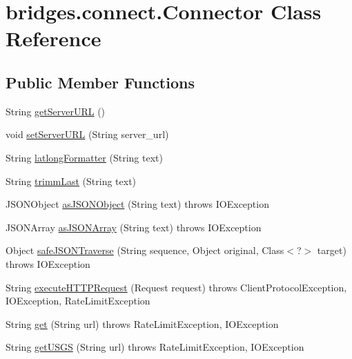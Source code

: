\hypertarget{classbridges_1_1connect_1_1_connector}{}\section{bridges.\+connect.\+Connector Class Reference}
\label{classbridges_1_1connect_1_1_connector}
\subsection*{Public Member Functions}
\begin{DoxyCompactItemize}
\item 
String \hyperlink{classbridges_1_1connect_1_1_connector_a0b9809180aac96a83e31e224ab5ed6ec}{get\+Server\+U\+R\+L} ()
\item 
void \hyperlink{classbridges_1_1connect_1_1_connector_a71f449c91e529f79730df27e01fdf674}{set\+Server\+U\+R\+L} (String server\+\_\+url)
\item 
String \hyperlink{classbridges_1_1connect_1_1_connector_a2318cd93d18ef58285598f6f9cdf727b}{latlong\+Formatter} (String text)
\item 
String \hyperlink{classbridges_1_1connect_1_1_connector_ac0dca0bd99b6abbbd8a77874a95e6d49}{trimm\+Last} (String text)
\item 
J\+S\+O\+N\+Object \hyperlink{classbridges_1_1connect_1_1_connector_aac3fb75dd7975c4439cfd1bf6cefe0a6}{as\+J\+S\+O\+N\+Object} (String text)  throws I\+O\+Exception 
\item 
J\+S\+O\+N\+Array \hyperlink{classbridges_1_1connect_1_1_connector_aa5bd647713545fa24c6d730eacb6bc54}{as\+J\+S\+O\+N\+Array} (String text)  throws I\+O\+Exception 
\item 
Object \hyperlink{classbridges_1_1connect_1_1_connector_ab7d1d242fbf9acade316650e54a3d020}{safe\+J\+S\+O\+N\+Traverse} (String sequence, Object original, Class$<$?$>$ target)  throws I\+O\+Exception 
\item 
String \hyperlink{classbridges_1_1connect_1_1_connector_aabcfde23d155c8c42edb8a1407320bc5}{execute\+H\+T\+T\+P\+Request} (Request request)  throws Client\+Protocol\+Exception, I\+O\+Exception, Rate\+Limit\+Exception 
\item 
String \hyperlink{classbridges_1_1connect_1_1_connector_aec8d54bf707c50d6f8173a0c1640fcd5}{get} (String url)  throws Rate\+Limit\+Exception, I\+O\+Exception 
\item 
String \hyperlink{classbridges_1_1connect_1_1_connector_a1781405c9b38c338bce042bf7ff23eaf}{get\+U\+S\+G\+S} (String url)  throws Rate\+Limit\+Exception, I\+O\+Exception

\end{DoxyCompactItemize}
